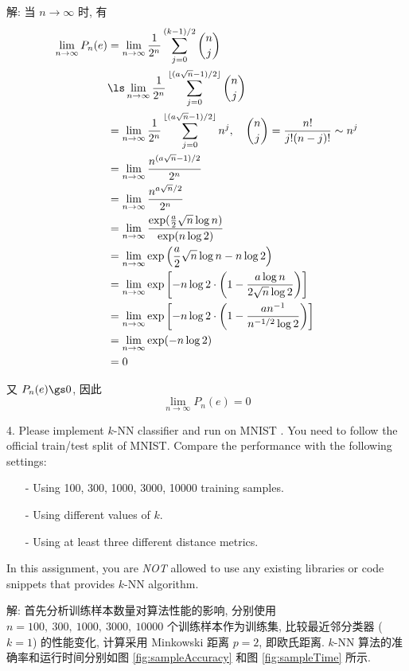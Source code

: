 \documentclass[openany]{ctexbook}
\theoremstyle{kaiti}
\theoremstyle{normal}
\begin{document}
解: 当 $n\to\infty$ 时, 有
\begin{equation}
  \begin{aligned}
    \lim_{n\to\infty}P_n(e)
    &=\lim_{n\to\infty}\frac{1}{2^n}\sum_{j=0}^{(k-1)/2}\binom{n}{j}\\
    &\ls\lim_{n\to\infty}\frac{1}{2^n}\sum_{j=0}^{\lfloor(a\sqrt{n}-1)/2\rfloor}\binom{n}{j}\\
    &=\lim_{n\to\infty}\frac{1}{2^n}\sum_{j=0}^{\lfloor(a\sqrt{n}-1)/2\rfloor}n^j,\quad\binom{n}{j}=\frac{n!}{j!(n-j)!}\sim n^j\\
    &=\lim_{n\to\infty}\frac{n^{(a\sqrt{n}-1)/2}}{2^n}\\
    &=\lim_{n\to\infty}\frac{n^{a\sqrt{n}/2}}{2^n}\\
    &=\lim_{n\to\infty}\frac{\exp(\frac{a}{2}\sqrt{n}\log n)}{\exp(n\log2)}\\
    &=\lim_{n\to\infty}\exp\left(\frac{a}{2}\sqrt{n}\log n-n\log2\right)\\
    &=\lim_{n\to\infty}\exp\left[-n\log2\cdot\left(1-\frac{a\log n}{2\sqrt{n}\log2}\right)\right]\\
    &=\lim_{n\to\infty}\exp\left[-n\log2\cdot\left(1-\frac{an^{-1}}{n^{-1/2}\log2}\right)\right]\\
    &=\lim_{n\to\infty}\exp(-n\log2)\\
    &=0\\
  \end{aligned}
\end{equation}

又 $P_n(e)\gs0$, 因此
\begin{equation}
  \lim_{n\to\infty}P_n(e)=0
\end{equation}

4. Please implement $k$-NN classifier and run on MNIST \cite{mnist}. You need to follow the official train/test split of MNIST. Compare the performance with the following settings:

\begin{enumerate}
	\item[-] Using 100, 300, 1000, 3000, 10000 training samples.
	\item[-] Using different values of $k$.
	\item[-] Using at least three different distance metrics.
\end{enumerate}

In this assignment, you are \emph{NOT} allowed to use any existing libraries or code snippets that provides $k$-NN algorithm.

解: 首先分析训练样本数量对算法性能的影响, 分别使用 $n=100,~300,~1000,~3000,~10000$ 个训练样本作为训练集, 比较最近邻分类器 ($k=1$) 的性能变化, 计算采用 Minkowski 距离 $p=2$, 即欧氏距离. $k$-NN 算法的准确率和运行时间分别如图 \ref{fig:sampleAccuracy} 和图 \ref{fig:sampleTime} 所示.
\end{document}
